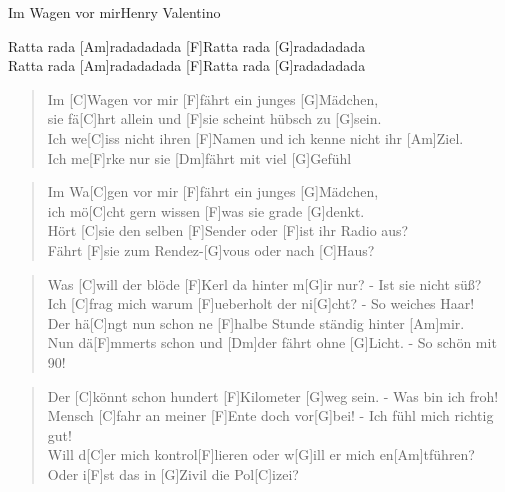 \begin{song}{Im Wagen vor mir}{Henry Valentino}

    \begin{chorus}
        [C]Ratta rada [Am]radadadada [F]Ratta rada [G]radadadada \\
        [C]Ratta rada [Am]radadadada [F]Ratta rada [G]radadadada
    \end{chorus}

    \begin{verse}
        Im [C]Wagen vor mir [F]fährt ein junges [G]Mädchen, \\
        sie fä[C]hrt allein und [F]sie scheint hübsch zu [G]sein. \\
        Ich we[C]iss nicht ihren [F]Namen und ich kenne nicht ihr [Am]Ziel. \\
        Ich me[F]rke nur sie [Dm]fährt mit viel [G]Gefühl
    \end{verse}

    \begin{verse}
        Im Wa[C]gen vor mir [F]fährt ein junges [G]Mädchen, \\
        ich mö[C]cht gern wissen [F]was sie grade [G]denkt. \\
        Hört [C]sie den selben [F]Sender oder [F]ist ihr Radio aus? \\
        Fährt [F]sie zum Rendez-[G]vous oder nach [C]Haus?
    \end{verse}


    \begin{verse}
        Was [C]will der blöde [F]Kerl da hinter m[G]ir nur? - Ist sie nicht süß? \\
        Ich [C]frag mich warum [F]ueberholt der ni[G]cht? - So weiches Haar! \\  %
        Der hä[C]ngt nun schon ne [F]halbe Stunde ständig hinter [Am]mir. \\
        Nun dä[F]mmerts schon und [Dm]der fährt ohne [G]Licht. - So schön mit 90!
    \end{verse}

    \begin{verse}
        Der [C]könnt schon hundert [F]Kilometer [G]weg sein. - Was bin ich froh! \\
        Mensch [C]fahr an meiner [F]Ente doch vor[G]bei! - Ich fühl mich richtig gut! \\
        Will d[C]er mich kontrol[F]lieren oder w[G]ill er mich en[Am]tführen? \\
        Oder i[F]st das in [G]Zivil die Pol[C]izei? 
    \end{verse}


\end{song}
